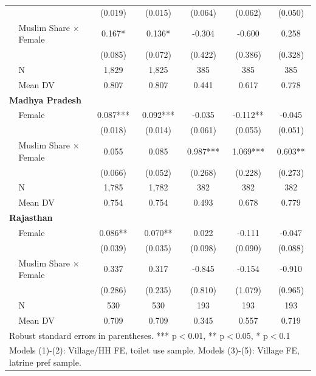 \begin{table}[htbp]
\begin{tabular}{llccccc}
 &  & (0.019) & (0.015) & (0.064) & (0.062) & (0.050) \\
 & Muslim Share $\times$ Female & 0.167* & 0.136* & -0.304 & -0.600 & 0.258 \\
 &  & (0.085) & (0.072) & (0.422) & (0.386) & (0.328) \\
 & N & 1,829 & 1,825 & 385 & 385 & 385 \\
 & Mean DV & 0.807 & 0.807 & 0.441 & 0.617 & 0.778 \\
\hline
\multicolumn{7}{l}{\textbf{Madhya Pradesh}} \\
 & Female & 0.087*** & 0.092*** & -0.035 & -0.112** & -0.045 \\
 &  & (0.018) & (0.014) & (0.061) & (0.055) & (0.051) \\
 & Muslim Share $\times$ Female & 0.055 & 0.085 & 0.987*** & 1.069*** & 0.603** \\
 &  & (0.066) & (0.052) & (0.268) & (0.228) & (0.273) \\
 & N & 1,785 & 1,782 & 382 & 382 & 382 \\
 & Mean DV & 0.754 & 0.754 & 0.493 & 0.678 & 0.779 \\
\hline
\multicolumn{7}{l}{\textbf{Rajasthan}} \\
 & Female & 0.086** & 0.070** & 0.022 & -0.111 & -0.047 \\
 &  & (0.039) & (0.035) & (0.098) & (0.090) & (0.088) \\
 & Muslim Share $\times$ Female & 0.337 & 0.317 & -0.845 & -0.154 & -0.910 \\
 &  & (0.286) & (0.235) & (0.810) & (1.079) & (0.965) \\
 & N & 530 & 530 & 193 & 193 & 193 \\
 & Mean DV & 0.709 & 0.709 & 0.345 & 0.557 & 0.719 \\
\hline
\multicolumn{7}{l}{\footnotesize Robust standard errors in parentheses. *** p$<$0.01, ** p$<$0.05, * p$<$0.1} \\
\multicolumn{7}{l}{\footnotesize Models (1)-(2): Village/HH FE, toilet use sample. Models (3)-(5): Village FE, latrine pref sample.} \\
\end{tabular}
\end{table}
